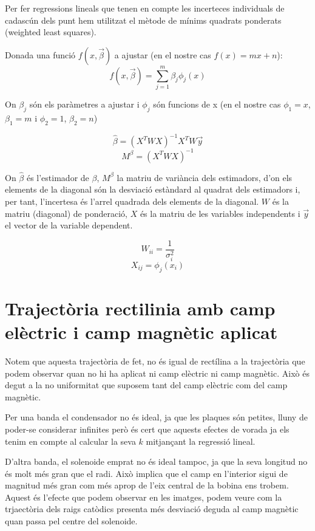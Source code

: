 \documentclass[11pt]{article}
\begin{document}
 Per fer regressions lineals que tenen en compte les incerteces individuals de cadascún dels punt hem utilitzat el mètode de mínims quadrats ponderats (weighted least squares).
 
 Donada una funció $f(x,\vec{\beta})$ a ajustar (en el nostre cas $f(x) = mx+n$):
 \begin{equation}
     f(x,\vec{\beta}) = \sum_{j=1}^m\beta_j\phi_j(x)
 \end{equation}
 
  On ${\beta_j}$ són els paràmetres a ajustar i $\phi_j$ són funcions de x (en el nostre cas $\phi_1 = x$, $\beta_1 = m$ i $\phi_2 = 1$, $\beta_2 = n$)
 
 \begin{equation}
     \hat{\beta} = (X^TWX)^{-1}X^TW\vec{y}
 \end{equation}
 \begin{equation}
     M^\beta = (X^TWX)^{-1}
 \end{equation}
 
 On $\hat{\beta}$ és l'estimador de $\beta$, $M^\beta$ la matriu de variància dels estimadors, d'on els elements de la diagonal són la desviació estàndard al quadrat dels estimadors i, per tant, l'incertesa és l'arrel quadrada dels elements de la diagonal. $W$ és la matriu (diagonal) de ponderació, $X$ és la matriu de les variables independents i $\vec{y}$ el vector de la variable dependent.
 
 \begin{equation}
     W_{ii} = \frac{1}{\sigma_i^2}
 \end{equation}
 \begin{equation}
     X_{ij} = \phi_j(x_i)
 \end{equation}

\section{Trajectòria rectilinia amb camp elèctric i camp magnètic aplicat}\label{sec: traj_no_rect}

Notem que aquesta trajectòria de fet, no és igual de rectílina a la trajectòria que podem observar quan no hi ha aplicat ni camp elèctric ni camp magnètic. Això és degut a la no uniformitat que suposem tant del camp elèctric com del camp magnètic. 

Per una banda el condensador no és ideal, ja que les plaques són petites, lluny de poder-se considerar infinites però és cert que aquests efectes de vorada ja els tenim en compte al calcular la seva $k$ mitjançant la regressió lineal. 

D'altra banda, el solenoide emprat no és ideal tampoc, ja que la seva longitud no és molt més gran que el radi. Això implica que el camp en l'interior sigui de magnitud més gran com més aprop de l'eix central de la bobina ens trobem. Aquest és l'efecte que podem observar en les imatges, podem veure com la trjaectòria dels raigs catòdics presenta més desviació deguda al camp magnètic quan passa pel centre del solenoide.
\end{document}
